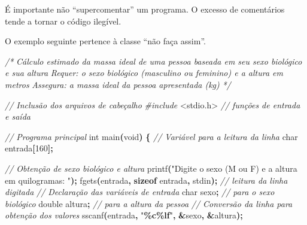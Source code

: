 \documentclass[
  11pt,
  a4paper,
]{scrbook}
\newenvironment{Shaded}{\begin{snugshade}}{\end{snugshade}}
\newcommand{\CommentTok}[1]{\textcolor[rgb]{0.56,0.35,0.01}{\textit{#1}}}
\newcommand{\DataTypeTok}[1]{\textcolor[rgb]{0.13,0.29,0.53}{#1}}
\newcommand{\DecValTok}[1]{\textcolor[rgb]{0.00,0.00,0.81}{#1}}
\newcommand{\ImportTok}[1]{#1}
\newcommand{\KeywordTok}[1]{\textcolor[rgb]{0.13,0.29,0.53}{\textbf{#1}}}
\newcommand{\NormalTok}[1]{#1}
\newcommand{\OperatorTok}[1]{\textcolor[rgb]{0.81,0.36,0.00}{\textbf{#1}}}
\newcommand{\PreprocessorTok}[1]{\textcolor[rgb]{0.56,0.35,0.01}{\textit{#1}}}
\newcommand{\SpecialCharTok}[1]{\textcolor[rgb]{0.81,0.36,0.00}{\textbf{#1}}}
\newcommand{\StringTok}[1]{\textcolor[rgb]{0.31,0.60,0.02}{#1}}
\begin{document}
\begin{tcolorbox}[enhanced jigsaw, arc=.35mm, bottomtitle=1mm, colbacktitle=quarto-callout-caution-color!10!white, title=\textcolor{quarto-callout-caution-color}{\faFire}\hspace{0.5em}{Cuidado}, toprule=.15mm, left=2mm, opacityback=0, colback=white, colframe=quarto-callout-caution-color-frame, opacitybacktitle=0.6, bottomrule=.15mm, leftrule=.75mm, toptitle=1mm, coltitle=black, titlerule=0mm, rightrule=.15mm, breakable]

É importante não ``supercomentar'' um programa. O excesso de comentários
tende a tornar o código ilegível.

O exemplo seguinte pertence à classe ``não faça assim''.

\begin{Shaded}
\begin{Highlighting}[]
\CommentTok{/*}
\CommentTok{Cálculo estimado da massa ideal de uma pessoa baseada em seu sexo biológico}
\CommentTok{e sua altura}
\CommentTok{Requer: o sexo biológico (masculino ou feminino) e a altura em metros}
\CommentTok{Assegura: a massa ideal da pessoa apresentada (kg)}
\CommentTok{*/}

\CommentTok{// Inclusão dos arquivos de cabeçalho}
\PreprocessorTok{\#include }\ImportTok{\textless{}stdio.h\textgreater{}}\PreprocessorTok{  }\CommentTok{// funções de entrada e saída}

\CommentTok{// Programa principal}
\DataTypeTok{int}\NormalTok{ main}\OperatorTok{(}\DataTypeTok{void}\OperatorTok{)} \OperatorTok{\{}
    \CommentTok{// Variável para a leitura da linha}
    \DataTypeTok{char}\NormalTok{ entrada}\OperatorTok{[}\DecValTok{160}\OperatorTok{];}

    \CommentTok{// Obtenção de sexo biológico e altura}
\NormalTok{    printf}\OperatorTok{(}\StringTok{"Digite o sexo (M ou F) e a altura em quilogramas: "}\OperatorTok{);}
\NormalTok{    fgets}\OperatorTok{(}\NormalTok{entrada}\OperatorTok{,} \KeywordTok{sizeof}\NormalTok{ entrada}\OperatorTok{,}\NormalTok{ stdin}\OperatorTok{);}  \CommentTok{// leitura da linha digitada}
    \CommentTok{// Declaração das variáveis de entrada}
    \DataTypeTok{char}\NormalTok{ sexo}\OperatorTok{;}  \CommentTok{// para o sexo biológico}
    \DataTypeTok{double}\NormalTok{ altura}\OperatorTok{;}  \CommentTok{// para a altura da pessoa}
    \CommentTok{// Conversão da linha para obtenção dos valores}
\NormalTok{    sscanf}\OperatorTok{(}\NormalTok{entrada}\OperatorTok{,} \StringTok{"}\SpecialCharTok{\%c\%lf}\StringTok{"}\OperatorTok{,} \OperatorTok{\&}\NormalTok{sexo}\OperatorTok{,} \OperatorTok{\&}\NormalTok{altura}\OperatorTok{);}


\end{Highlighting}
\end{Shaded}
\end{tcolorbox}
\end{document}
